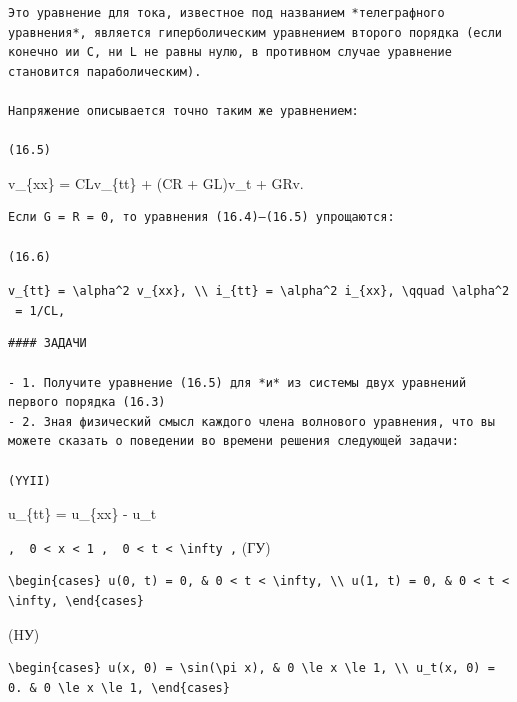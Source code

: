 \documentclass[
  ukrainian,
]{article}
\begin{document}
\begin{verbatim}
Это уравнение для тока, известное под названием *телеграфного уравнения*, является гиперболическим уравнением второго порядка (если конечно ии C, ни L не равны нулю, в противном случае уравнение становится параболическим).

Напряжение описывается точно таким же уравнением:

(16.5)
\end{verbatim}

v\_\{xx\} = CLv\_\{tt\} + (CR + GL)v\_t + GRv.

\begin{verbatim}
Если G = R = 0, то уравнения (16.4)—(16.5) упрощаются:

(16.6)
\end{verbatim}

\texttt{v\_\{tt\}\ =\ \textbackslash{}alpha\^{}2\ v\_\{xx\},\ \textbackslash{}\textbackslash{}\ i\_\{tt\}\ =\ \textbackslash{}alpha\^{}2\ i\_\{xx\},\ \textbackslash{}qquad\ \textbackslash{}alpha\^{}2\ =\ 1/CL,}

\begin{verbatim}
#### ЗАДАЧИ

- 1. Получите уравнение (16.5) для *и* из системы двух уравнений первого порядка (16.3)
- 2. Зная физический смысл каждого члена волнового уравнения, что вы можете сказать о поведении во времени решения следующей задачи:

(YYII)
\end{verbatim}

u\_\{tt\} = u\_\{xx\} - u\_t

\texttt{,\ \ \textquotesingle{}0\ \textless{}\ x\ \textless{}\ 1\textquotesingle{}\ ,\ \ \textquotesingle{}0\ \textless{}\ t\ \textless{}\ \textbackslash{}infty\textquotesingle{}\ ,}
(ГУ)

\begin{verbatim}
\begin{cases} u(0, t) = 0, & 0 < t < \infty, \\ u(1, t) = 0, & 0 < t < \infty, \end{cases}
\end{verbatim}

(HУ)

\begin{verbatim}
\begin{cases} u(x, 0) = \sin(\pi x), & 0 \le x \le 1, \\ u_t(x, 0) = 0. & 0 \le x \le 1, \end{cases}
\end{verbatim}
\end{document}
